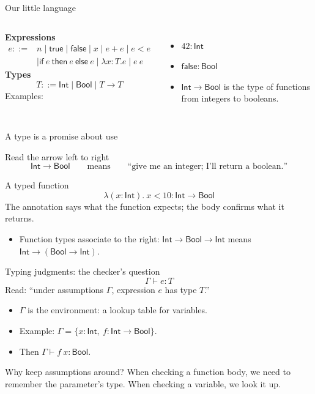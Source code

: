 \documentclass[aspectratio=169,11pt]{beamer}
\newcommand{\Bool}{\mathsf{Bool}}
\newcommand{\Int}{\mathsf{Int}}
\newcommand{\Arrow}{\mathbin{\to}}
\begin{document}
\begin{frame}{Our little language}
\begin{columns}[T]
\textbf{Expressions}
\begin{align*}
e ::= {}& n \mid \mathsf{true} \mid \mathsf{false} \mid x \mid e+e \mid e<e\\
       &\mid \mathsf{if}\ e\ \mathsf{then}\ e\ \mathsf{else}\ e
        \mid \lambda x{:}T.e \mid e\ e
\end{align*}
\textbf{Types}
\[
T ::= \Int \mid \Bool \mid T\Arrow T
\]
\medskip
Examples:
\begin{itemize}
  \item $42 : \Int$
  \item $\mathsf{false} : \Bool$
  \item $\Int\Arrow\Bool$ is the type of functions from integers to booleans.
\end{itemize}
\end{columns}
\end{frame}

\begin{frame}{A type is a promise about use}
\begin{block}{Read the arrow left to right}
\[
  \Int\Arrow\Bool \qquad\text{means}\qquad
  \text{“give me an integer; I'll return a boolean.”}
\]
\end{block}
\begin{exampleblock}{A typed function}
\[
  \lambda (x:\Int).\ x<10 : \Int\Arrow\Bool
\]
The annotation says what the function expects; the body confirms what it returns.
\end{exampleblock}
\begin{itemize}
  \item Function types associate to the right: $\Int\Arrow\Bool\Arrow\Int$ means $\Int\Arrow(\Bool\Arrow\Int)$.
\end{itemize}
\end{frame}

\begin{frame}{Typing judgments: the checker’s question}
\[
  \Gamma \vdash e:T
\]
Read: “under assumptions $\Gamma$, expression $e$ has type $T$.”
\begin{itemize}
  \item $\Gamma$ is the environment: a lookup table for variables.
  \item Example: $\Gamma = \{x:\Int,\ f:\Int\Arrow\Bool\}$.
  \item Then $\Gamma\vdash f\ x:\Bool$.
\end{itemize}
\begin{block}{Why keep assumptions around?}
When checking a function body, we need to remember the parameter's type. When checking a variable, we look it up.
\end{block}
\end{frame}
\end{document}
